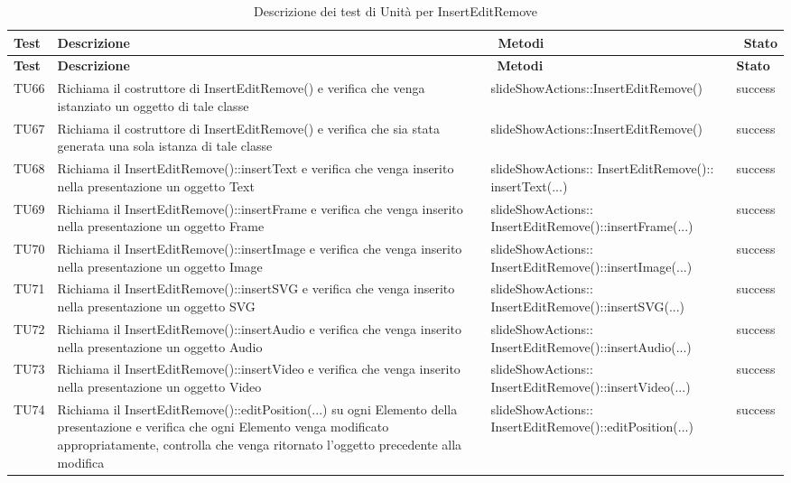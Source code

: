 		  		   \begin{longtable} [c]{| p{1cm} | p{6cm} | p{7cm} | p{1.5cm} |}
		 		 	 						\caption{Descrizione dei test di Unità per InsertEditRemove \label{tab:verTestUnit}}\\
		 	  		 \hline
		 	  		 \textbf{Test} & \textbf{Descrizione} & \ \textbf{Metodi} & \ \textbf{Stato} \\
		 	  		 \hline
		 	  		 \endfirsthead
		 	  		 \hline
		 	  		 \textbf{Test} & \textbf{Descrizione} & \ \textbf{Metodi} & \textbf{Stato} \\
		 	  		 \hline
		 		 	 						\endhead
		 	  		 \hline
		 	  		 \endfoot
		 	  		 \hline
		 	  		 \endlastfoot
		  		 TU66 & Richiama il costruttore di InsertEditRemove() e verifica che venga istanziato un oggetto di tale classe  & slideShowActions::InsertEditRemove() & success \\
		  		 TU67 & Richiama il costruttore di InsertEditRemove() e verifica che sia stata generata una sola istanza di tale classe  & slideShowActions::InsertEditRemove() & success \\
		 		 TU68 & Richiama il InsertEditRemove()::insertText e verifica che venga inserito nella presentazione un oggetto Text & slideShowActions:: InsertEditRemove():: insertText(...) & success \\
		 		 TU69 & Richiama il InsertEditRemove()::insertFrame e verifica che venga inserito nella presentazione un oggetto Frame\ped{g}  & slideShowActions:: InsertEditRemove()::insertFrame(...) & success \\
		 		 TU70 & Richiama il InsertEditRemove()::insertImage e verifica che venga inserito nella presentazione un oggetto Image  & slideShowActions:: InsertEditRemove()::insertImage(...) & success \\
		 		 TU71 & Richiama il InsertEditRemove()::insertSVG e verifica che venga inserito nella presentazione un oggetto SVG  & slideShowActions:: InsertEditRemove()::insertSVG(...) & success \\
		 		 TU72 & Richiama il InsertEditRemove()::insertAudio e verifica che venga inserito nella presentazione un oggetto Audio  & slideShowActions:: InsertEditRemove()::insertAudio(...) & success \\
		 		 TU73 & Richiama il InsertEditRemove()::insertVideo e verifica che venga inserito nella presentazione un oggetto Video  & slideShowActions:: InsertEditRemove()::insertVideo(...) & success \\
		 		 TU74 & Richiama il InsertEditRemove()::editPosition(...) su ogni Elemento\ped{g} della presentazione e verifica che ogni Elemento\ped{g} venga modificato appropriatamente, controlla che venga ritornato l'oggetto precedente alla modifica   & slideShowActions:: InsertEditRemove()::editPosition(...) & success \\

\end{longtable}
